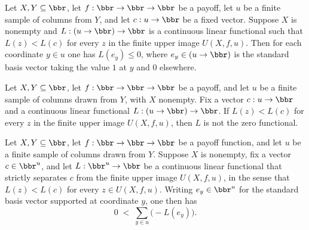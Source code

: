 \begin{lemma}
\label{OnlineLearning.separating_coordinate_nonpos}
\leanok
{}
Let $X, Y \subseteq \bbr$, let $f : \bbr \to \bbr \to \bbr$ be a payoff, let $u$ be a
finite sample of columns from $Y$, and let $c : u \to \bbr$ be a fixed vector. Suppose
$X$ is nonempty and $L : (u \to \bbr) \to \bbr$ is a continuous linear functional such
that $L(z) < L(c)$ for every $z$ in the finite upper image $U(X,f,u)$. Then for each
coordinate $y \in u$ one has $L(e_y) \le 0$, where $e_y \in (u \to \bbr)$ is the
standard basis vector taking the value $1$ at $y$ and $0$ elsewhere.
\end{lemma}

\begin{lemma}
\label{OnlineLearning.separating_functional_ne_zero}
\leanok
{}
Let $X, Y \subseteq \bbr$, let $f : \bbr \to \bbr \to \bbr$ be a payoff, and let $u$ be
a finite sample of columns drawn from $Y$, with $X$ nonempty. Fix a vector $c : u \to
\bbr$ and a continuous linear functional $L : (u \to \bbr) \to \bbr$. If $L(z) < L(c)$
for every $z$ in the finite upper image $U(X,f,u)$, then $L$ is not the zero functional.
\end{lemma}

\begin{lemma}
\label{OnlineLearning.separating_weight_sum_pos}
\leanok
{}
Let $X, Y \subseteq \bbr$, let $f : \bbr \to \bbr \to \bbr$ be a payoff function, and
let $u$ be a finite sample of columns drawn from $Y$. Suppose $X$ is nonempty, fix a
vector $c \in \bbr^u$, and let $L : \bbr^u \to \bbr$ be a continuous linear functional
that strictly separates $c$ from the finite upper image $U(X,f,u)$, in the sense that
$L(z) < L(c)$ for every $z \in U(X,f,u)$. Writing $e_y \in \bbr^u$ for the standard
basis vector supported at coordinate $y$, one then has
\[
  0 \;<\; \sum_{y \in u} \bigl(-L(e_y)\bigr).
\]
\end{lemma}


